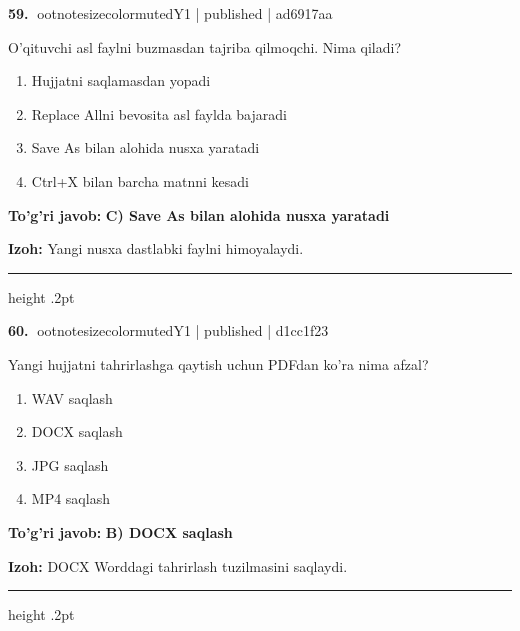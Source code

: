 \documentclass[10pt,a4paper]{article}
\begin{document}
\textbf{\color{ink}59.} {ootnotesizecolor{muted}Y1 | published | ad6917aa}
\par
O'qituvchi asl faylni buzmasdan tajriba qilmoqchi. Nima qiladi?
\begin{enumerate}[label=\Alph*),leftmargin=9mm]
\item Hujjatni saqlamasdan yopadi
\item Replace Allni bevosita asl faylda bajaradi
\item Save As bilan alohida nusxa yaratadi
\item Ctrl+X bilan barcha matnni kesadi
\end{enumerate}
\begin{tcolorbox}[enhanced,breakable,colback=teal!4,colframe=teal!55!black,boxrule=0.45pt,arc=1.2mm,left=2.8mm,right=2.8mm,top=2mm,bottom=2mm]
\textbf{\color{teal}To'g'ri javob:} \textbf{C) Save As bilan alohida nusxa yaratadi}
\par\smallskip
\textbf{Izoh:} Yangi nusxa dastlabki faylni himoyalaydi.
\end{tcolorbox}
\vspace{2mm}\hrule height .2pt\vspace{2mm}

\textbf{\color{ink}60.} {ootnotesizecolor{muted}Y1 | published | d1cc1f23}
\par
Yangi hujjatni tahrirlashga qaytish uchun PDFdan ko'ra nima afzal?
\begin{enumerate}[label=\Alph*),leftmargin=9mm]
\item WAV saqlash
\item DOCX saqlash
\item JPG saqlash
\item MP4 saqlash
\end{enumerate}
\begin{tcolorbox}[enhanced,breakable,colback=teal!4,colframe=teal!55!black,boxrule=0.45pt,arc=1.2mm,left=2.8mm,right=2.8mm,top=2mm,bottom=2mm]
\textbf{\color{teal}To'g'ri javob:} \textbf{B) DOCX saqlash}
\par\smallskip
\textbf{Izoh:} DOCX Worddagi tahrirlash tuzilmasini saqlaydi.
\end{tcolorbox}
\vspace{2mm}\hrule height .2pt\vspace{2mm}
\end{document}
